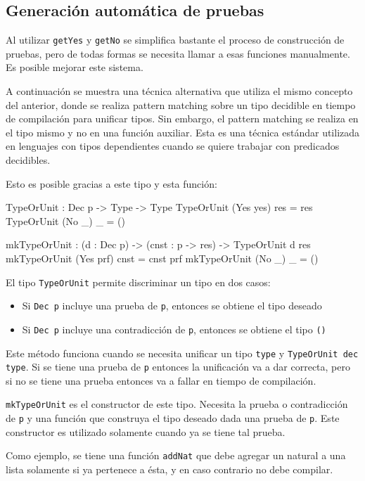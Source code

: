 \subsection{Generación automática de pruebas}

Al utilizar \texttt{getYes} y \texttt{getNo} se simplifica bastante el proceso de construcción de pruebas, pero de todas formas se necesita llamar a esas funciones manualmente. Es posible mejorar este sistema.

A continuación se muestra una técnica alternativa que utiliza el mismo concepto del anterior, donde se realiza pattern matching sobre un tipo decidible en tiempo de compilación para unificar tipos. Sin embargo, el pattern matching se realiza en el tipo mismo y no en una función auxiliar. Esta es una técnica estándar utilizada en lenguajes con tipos dependientes cuando se quiere trabajar con predicados decidibles.

Esto es posible gracias a este tipo y esta función:

\begin{code}
TypeOrUnit : Dec p -> Type -> Type
TypeOrUnit (Yes yes) res = res
TypeOrUnit (No _) _ = ()

mkTypeOrUnit : (d : Dec p) -> (cnst : p -> res) ->
  TypeOrUnit d res
mkTypeOrUnit (Yes prf) cnst = cnst prf
mkTypeOrUnit (No _) _ = ()
\end{code}

El tipo \texttt{TypeOrUnit} permite discriminar un tipo en dos casos:
\begin{itemize}
\item Si \texttt{Dec p} incluye una prueba de \texttt{p}, entonces se obtiene el tipo deseado
\item Si \texttt{Dec p} incluye una contradicción de \texttt{p}, entonces se obtiene el tipo \texttt{()}
\end{itemize}

Este método funciona cuando se necesita unificar un tipo \texttt{type} y \texttt{TypeOrUnit dec type}. Si se tiene una prueba de \texttt{p} entonces la unificación va a dar correcta, pero si no se tiene una prueba entonces va a fallar en tiempo de compilación.

\texttt{mkTypeOrUnit} es el constructor de este tipo. Necesita la prueba o contradicción de \texttt{p} y una función que construya el tipo deseado dada una prueba de \texttt{p}. Este constructor es utilizado solamente cuando ya se tiene tal prueba.

Como ejemplo, se tiene una función \texttt{addNat} que debe agregar un natural a una lista solamente si ya pertenece a ésta, y en caso contrario no debe compilar.

